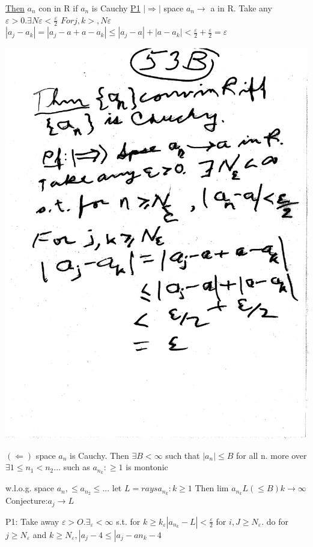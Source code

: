 \documentclass[10pt,a4paper]{article}
\begin{document}
\newpage
\underline{Then} ${a_n}$ con in R if ${a_n}$ is Cauchy
\underline{P1} $| \Rightarrow|$ space $a_n \longrightarrow$ a in R. Take any $\varepsilon > 0. \exists N \varepsilon < \frac {\varepsilon} {2}$ 
$For j,k>, N\varepsilon$ 
$|a_j-a_{k}|=|a_j-a+a-a_k|
\leq |a_j-a|+|a-a_k|
< \frac{\varepsilon}{2} + \frac{\varepsilon}{2}
=\varepsilon$

\includegraphics[scale=.5]{Pages/LC_12}

\newpage
$(\Leftarrow)$ space ${a_n}$ is Cauchy.
Then $\exists B < \infty$ such that $|a_n| \leq B$ for all n. more over $\exists 1 \leq n_{1} < n_{2}...$ such as ${a_{n_{k}} :\geq 1}$ is montonic

 w.l.o.g. space $a_{n}, \leq a_{n_2} \leq...$ let $L= rays a_{n_{k}} : k \geq 1$ Then lim $a_{n_{k}}  L (\leq B) k\longrightarrow \infty$ 
Conjecture:$a_j \rightarrow L$

P1: Take away $\varepsilon > O. \exists_\varepsilon < \infty$ s.t. for $k \geq k_\varepsilon |a_{n_{k}} - L| < \frac{\varepsilon}{2}$ for $i,J \geq N_\varepsilon.$ do for $j \geq N_\varepsilon$ and $k \geq N_\varepsilon, |a_j - 4 \leq |a_j - a{n_{k}} - 4$ \\
\end{document}
